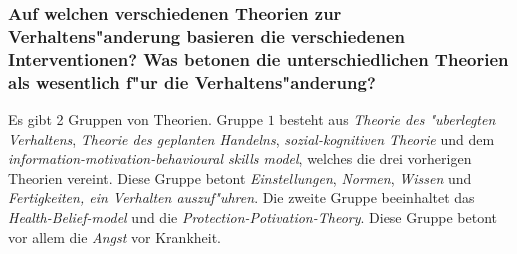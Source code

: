 \subsubsection{Auf welchen verschiedenen Theorien zur Verhaltens"anderung basieren die verschiedenen Interventionen? Was betonen die unterschiedlichen Theorien als wesentlich f"ur die Verhaltens"anderung?}
Es gibt 2 Gruppen von Theorien. Gruppe $1$ besteht aus \emph{Theorie des "uberlegten Verhaltens}, \emph{Theorie des geplanten Handelns}, \emph{sozial-kognitiven Theorie} und dem \emph{information-motivation-behavioural skills model},  welches die drei vorherigen Theorien vereint. Diese Gruppe betont \emph{Einstellungen}, \emph{Normen}, \emph{Wissen} und \emph{Fertigkeiten, ein Verhalten auszuf"uhren}.
Die zweite Gruppe beeinhaltet das \emph{Health-Belief-model} und die \emph{Protection-Potivation-Theory}. Diese Gruppe betont vor allem die \emph{Angst} vor Krankheit.


